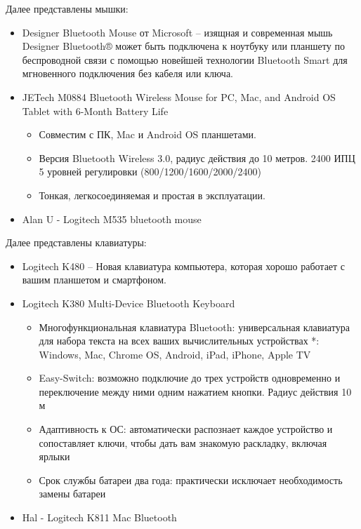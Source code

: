 \documentclass[a4paper, 14pt]{article}
\begin{document}
\par Далее представлены мышки:

\begin{itemize}
    \item Designer Bluetooth Mouse от Microsoft -- изящная и современная мышь Designer Bluetooth® может быть подключена к ноутбуку или планшету по беспроводной связи с помощью новейшей технологии Bluetooth Smart для мгновенного подключения без кабеля или ключа.
    \item JETech M0884 Bluetooth Wireless Mouse for PC, Mac, and Android OS Tablet with 6-Month Battery Life
    \begin{itemize}
        \item Совместим с ПК, Mac и Android OS планшетами.
        \item Версия Bluetooth Wireless 3.0, радиус действия до 10 метров. 2400 ИПЦ 5 уровней регулировки (800/1200/1600/2000/2400)
        \item Тонкая, легкосоединяемая и простая в эксплуатации.
    \end{itemize}
    \item Alan U - Logitech M535 bluetooth mouse
\end{itemize}

\par Далее представлены клавиатуры:
\begin{itemize}
    \item Logitech K480 --  Новая клавиатура компьютера, которая хорошо работает с вашим планшетом и смартфоном.
    \item Logitech K380 Multi-Device Bluetooth Keyboard
    \begin{itemize}
        \item Многофункциональная клавиатура Bluetooth: универсальная клавиатура для набора текста на всех ваших вычислительных устройствах *: Windows, Mac, Chrome OS, Android, iPad, iPhone, Apple TV
        \item Easy-Switch: возможно подключие до трех устройств одновременно и переключение между ними одним нажатием кнопки. Радиус действия 10 м
        \item Адаптивность к ОС: автоматически распознает каждое устройство и сопоставляет ключи, чтобы дать вам знакомую раскладку, включая ярлыки
        \item Срок службы батареи два года: практически исключает необходимость замены батареи
    \end{itemize}
    \item Hal - Logitech K811 Mac Bluetooth
\end{itemize}
\end{document}
